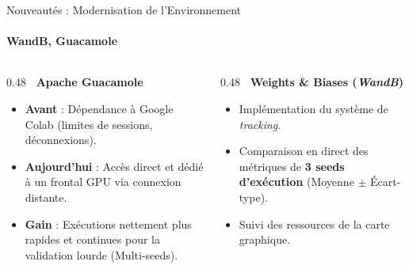 \documentclass[aspectratio=169, 10pt]{beamer}
\begin{document}
\begin{frame}{Nouveautés : Modernisation de l'Environnement}
\framesubtitle{WandB, Guacamole}
  \begin{columns}[T]
    \begin{column}{0.48\textwidth}
      \textbf{\color{hfcolor}\faDesktop\ Apache Guacamole}
      \begin{itemize}\footnotesize\setlength\itemsep{2pt}
        \item \textbf{Avant} : Dépendance à Google Colab (limites de sessions, déconnexions).
        \item \textbf{Aujourd'hui} : Accès direct et dédié à un frontal GPU via connexion distante.
        \item \textbf{Gain} : Exécutions nettement plus rapides et continues pour la validation lourde (Multi-seeds).
      \end{itemize}
    \end{column}
    \begin{column}{0.48\textwidth}
      \textbf{\color{accent}\faChartLine\ Weights \& Biases (\textit{WandB})}
      \begin{itemize}\footnotesize\setlength\itemsep{2pt}
        \item Implémentation du système de \textit{tracking}.
        \item Comparaison en direct des métriques de \textbf{3 seeds d'exécution} (Moyenne $\pm$ Écart-type).
        \item Suivi des ressources de la carte graphique.
      \end{itemize}
    \end{column}
  \end{columns}
\end{frame}
\end{document}
